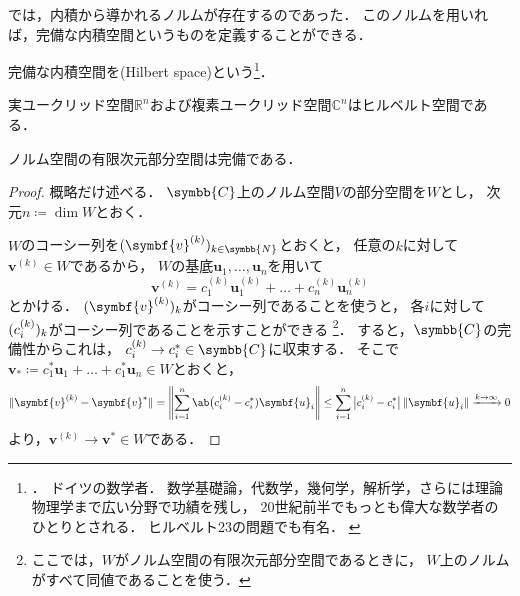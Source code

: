 \documentclass[../sotsu.tex]{subfiles}
\begin{document}
では，内積から導かれるノルムが存在するのであった．
このノルムを用いれば，完備な内積空間というものを定義することができる．

\begin{definition}[ヒルベルト空間]
    \label{dfn:Hilbert-space}
    完備な内積空間を(Hilbert space)という\footnote{
        ．
        ドイツの数学者．
        数学基礎論，代数学，幾何学，解析学，さらには理論物理学まで広い分野で功績を残し，
        20世紀前半でもっとも偉大な数学者のひとりとされる．
        ヒルベルト23の問題でも有名．
        \cite{nipponica}\cite{iwanami-sugakujiten}
    }．
\end{definition}

\begin{proposition}
    実ユークリッド空間$ℝ^n$および複素ユークリッド空間$ℂ^n$はヒルベルト空間である．
\end{proposition}





\begin{theorem}
    \label{thm:subspace-of-norm-space-is-complete}
    ノルム空間の有限次元部分空間は完備である\cite[定理1.2の系]{iwanami-functional}．
\end{theorem}

\begin{proof}
    概略だけ述べる．
    $\symbb{C}$上のノルム空間$V$の部分空間を$W$とし，
    次元$n \coloneq \dim W$とおく．
    
    $W$のコーシー列を$\sequ{\symbf{v}^{(k)}}[k \in \symbb{N}]$とおくと，
    任意の$k$に対して$\symbf{v}^{(k)} \in W$であるから，
    $W$の基底$\symbf{u}_1, \dots, \symbf{u}_n$を用いて
    \[  \symbf{v}^{(k)} = c^{(k)}_1 \symbf{u}^{(k)}_1 + \dots + c^{(k)}_n \symbf{u}^{(k)}_n  \]
    とかける．
    $\sequ{\symbf{v}^{(k)}}[k]$がコーシー列であることを使うと，
    各$i$に対して$\sequ{c^{(k)}_i}[k]$がコーシー列であることを示すことができる%
    \footnote{
        ここでは，$W$がノルム空間の有限次元部分空間であるときに，
        $W$上のノルムがすべて同値であることを使う\cite[定理1.2]{iwanami-functional}．
    }．
    すると，$\symbb{C}$の完備性からこれは，
    $c^{(k)}_i \to c^*_i \in \symbb{C}$に収束する．
    そこで$\symbf{v}_* \coloneq c^*_1 \symbf{u}_1 + \dots + c^*_1 \symbf{u}_n \in W$とおくと，
    \begin{equation*}
        \begin{split}
            \norm{ \symbf{v}^{(k)} - \symbf{v}^* }
                = \norm*{ \sum_{i = 1}^{n} \ab\big(c^{(k)}_i - c^*_i) \symbf{u}_i }
                \leq \sum_{i=1}^{n} \, \abs[\big]{ c^{(k)}_i - c^*_i } \, \norm{ \symbf{u}_i }
                \xrightarrow{k \to \infty} 0
        \end{split}
    \end{equation*}
    より，$\symbf{v}^{(k)} \to \symbf{v}^* \in W$である．
\end{proof}
\end{document}
